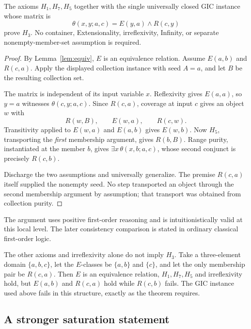 \begin{theorem}
\label{thm:collectioncong}
The axioms $H_1,H_7,H_5$ together with the single universally
closed GIC instance whose matrix is
\[
 \theta(x,y;a,c)=E(y,a)\land R(c,y)
\]
prove $H_3$. No container, Extensionality, irreflexivity,
Infinity, or separate nonempty-member-set assumption is
required.
\end{theorem}
\begin{proof}
By Lemma~\ref{lem:equiv}, $E$ is an equivalence relation.
Assume $E(a,b)$ and $R(c,a)$. Apply the displayed collection
instance with seed $A=a$, and let $B$ be the resulting
collection set.

The matrix is independent of its input variable $x$.
Reflexivity gives $E(a,a)$, so $y=a$ witnesses
$\theta(c,y;a,c)$. Since $R(c,a)$, coverage at input $c$
gives an object $w$ with
\[
 R(w,B),\qquad E(w,a),\qquad R(c,w).
\]
Transitivity applied to $E(w,a)$ and $E(a,b)$ gives $E(w,b)$.
Now $H_5$, transporting the \emph{first} membership argument,
gives $R(b,B)$. Range purity, instantiated at the member $b$,
gives $\exists x\,\theta(x,b;a,c)$, whose second conjunct
is precisely $R(c,b)$.

Discharge the two assumptions and universally generalize.
The premise $R(c,a)$ itself supplied the nonempty seed.
No step transported an object through the second membership
argument by assumption; that transport was obtained from
collection purity.
\end{proof}

The argument uses positive first-order reasoning and is
intuitionistically valid at this local level. The later
consistency comparison is stated in ordinary classical
first-order logic.

\begin{remark}
The other axioms and irreflexivity alone do not imply $H_3$.
Take a three-element domain $\{a,b,c\}$, let the $E$-classes
be $\{a,b\}$ and $\{c\}$, and let the only membership pair
be $R(c,a)$. Then $E$ is an equivalence relation, $H_1,H_7,H_5$
and irreflexivity hold, but $E(a,b)$ and $R(c,a)$ hold while
$R(c,b)$ fails. The GIC instance used above fails in this
structure, exactly as the theorem requires.
\end{remark}

\subsection{A stronger saturation statement}


